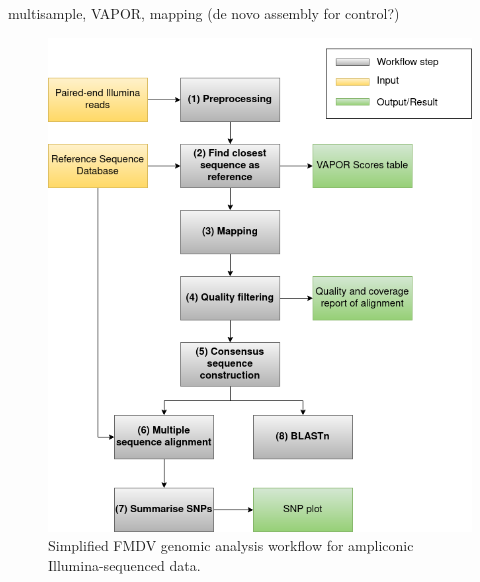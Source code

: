 multisample, VAPOR, mapping (de novo assembly for control?)

\begin{figure}[ht!]
	\includegraphics[width=1\textwidth]{media/3-fmdv.png}
	\caption{Simplified \ac{FMDV} genomic analysis workflow for ampliconic Illumina-sequenced data.}
	\label{fig:3-fmdv-wf}
\end{figure}
